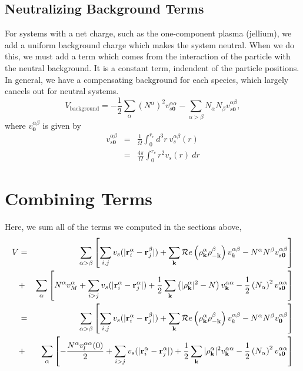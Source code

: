 \documentclass{article}
\begin{document}
\subsection{Neutralizing Background Terms}
For systems with a net charge, such as the one-component plasma
(jellium), we add a uniform background charge which makes the system
neutral.  When we do this, we must add a term which comes from the
interaction of the particle with the neutral background.  It is a
constant term, indendent of the particle positions.  In general, we
have a compensating background for each species, which largely cancels
out for neutral systems.
\begin{equation}
V_\text{background} = -\frac{1}{2} \sum_\alpha \left(N^\alpha\right)^2 
v^{\alpha \alpha}_{s\mathbf{0}}
-\sum_{\alpha > \beta} N_\alpha N_\beta
v^{\alpha\beta}_{s\mathbf{0}},
\end{equation}
where $v^{\alpha \beta}_\mathbf{0}$ is given by
\begin{eqnarray}
v^{\alpha \beta}_{s\mathbf{0}} & = & \frac{1}{\Omega} \int_0^{r_c} d^3 r\ 
v^{\alpha \beta}_s(r) \\
& = & \frac{4 \pi}{\Omega} \int_0^{r_c} r^2 v_s(r) \ dr \nonumber
\end{eqnarray}


\section{Combining Terms}
Here, we sum all of the terms we computed in the sections above,
\begin{eqnarray}
V & = & \sum_{\alpha > \beta} \left[\sum_{i,j} v_s(|\mathbf{r}_i^\alpha
  -\mathbf{r}_j^\beta|) + \sum_{\mathbf{k}} \mathcal{R}e\left(\rho_{\mathbf{k}}^\alpha
  \rho_{-\mathbf{k}}^\beta\right)v^{\alpha\beta}_k  -N^\alpha N^\beta
  v^{\alpha \beta}_{s\mathbf{0}}  \right] \nonumber \\
& + & \sum_\alpha \left[ N^\alpha v_M^\alpha + \sum_{i>j} v_s(|\mathbf{r}_i^\alpha -
  \mathbf{r}_j^\alpha|) + \frac{1}{2} \sum_{\mathbf{k}} \left( |\rho_{\mathbf{k}}^\alpha|^2 -
  N\right) v^{\alpha\alpha}_{\mathbf{k}} -\frac{1}{2}\left(N_\alpha\right)^2 v_{s\mathbf{0}}^{\alpha\alpha}\right] \nonumber \\
& = & \sum_{\alpha > \beta} \left[\sum_{i,j} v_s(|\mathbf{r}_i^\alpha
  -\mathbf{r}_j^\beta|) + \sum_{\mathbf{k}} \mathcal{R}e\left(\rho_{\mathbf{k}}^\alpha
  \rho_{-\mathbf{k}}^\beta\right) v^{\alpha \beta}_k   -N^\alpha N^\beta
  v^{\alpha \beta}_\mathbf{0}  \right] \\
& + & \sum_\alpha \left[ -\frac{N^\alpha v_l^{\alpha \alpha}(0)}{2}  + \sum_{i>j} v_s(|\mathbf{r}_i^\alpha -
  \mathbf{r}_j^\alpha|) + \frac{1}{2} \sum_{\mathbf{k}} |\rho_{\mathbf{k}}^\alpha|^2 v^{\alpha\alpha}_{\mathbf{k}} - \frac{1}{2}\left(N_\alpha\right)^2
  v_{s\mathbf{0}}^{\alpha\alpha} \right]  \nonumber
\end{eqnarray}
\end{document}

